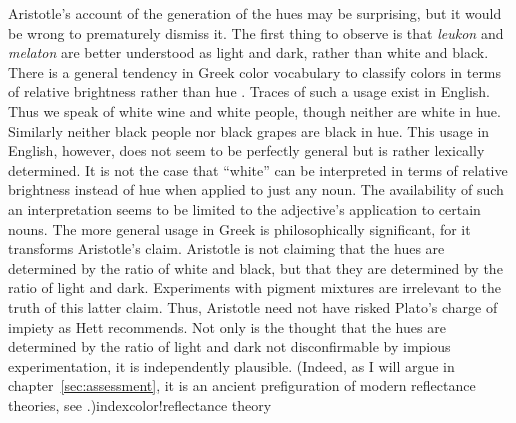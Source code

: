 Aristotle's account of the generation of the hues may be surprising, but it would be wrong to prematurely dismiss it. The first thing to observe is that \emph{leukon} and \emph{melaton} are better understood as light and dark, rather than white and black. There is a general tendency in Greek color vocabulary to classify colors in terms of relative brightness rather than hue \citep[see][]{Gladstone:1858fk,Platnauer:1921bh,Osbourne:1968vn,Lloyd:2007fk}. Traces of such a usage exist in English. Thus we speak of white wine and white people, though neither are white in hue. Similarly neither black people nor black grapes are black in hue. This usage in English, however, does not seem to be perfectly general but is rather lexically determined. It is not the case that ``white'' can be interpreted in terms of relative brightness instead of hue when applied to just any noun. The availability of such an interpretation seems to be limited to the adjective's application to certain nouns. The more general usage in Greek is philosophically significant, for it transforms Aristotle's claim. Aristotle is not claiming that the hues are determined by the ratio of white and black, but that they are determined by the ratio of light and dark. Experiments with pigment mixtures are irrelevant to the truth of this latter claim. Thus, Aristotle need not have risked Plato's charge of impiety as Hett recommends. Not only is the thought that the hues are determined by the ratio of light and dark not disconfirmable by impious experimentation, it is independently plausible. (Indeed, as I will argue in chapter~\ref{sec:assessment}, it is an ancient prefiguration of modern reflectance theories, see \citealt{Hilbert:1987jq}.)index{color!reflectance theory}

